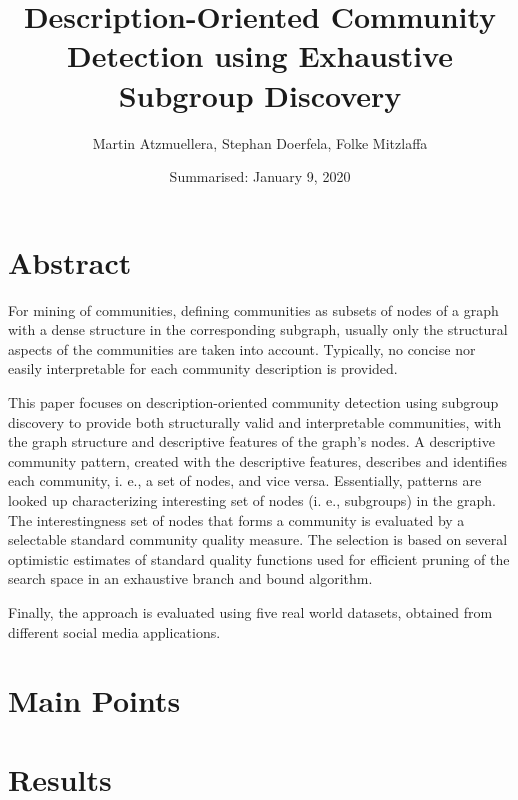\documentclass[a4paper]{article}
\title{Description-Oriented Community Detection using Exhaustive Subgroup Discovery}
\date{Summarised: January 9, 2020}
\author{Martin Atzmuellera, Stephan Doerfela, Folke Mitzlaffa}
\begin{document}
\maketitle
\section{Abstract}
For mining of communities, defining communities as subsets of nodes of a graph with a dense structure in the corresponding subgraph, usually only the structural aspects of the communities are taken into account. Typically, no concise nor easily interpretable for each community description is provided.

This paper focuses on description-oriented community detection using subgroup discovery to provide both structurally valid and interpretable communities, with the graph structure and descriptive features of the graph’s nodes. A descriptive community pattern, created with the descriptive features, describes and identifies each community, i. e., a set of nodes, and vice versa.
Essentially, patterns are looked up characterizing interesting set of nodes (i. e., subgroups) in the graph. The interestingness set of nodes that forms a community is evaluated by a selectable standard community quality measure.
The selection is based on several optimistic estimates of standard quality functions used for efficient pruning of the search space in an exhaustive branch and bound algorithm.

Finally, the approach is evaluated using five real world datasets, obtained from different social media applications.

\section{Main Points}

\section{Results}
\end{document}
